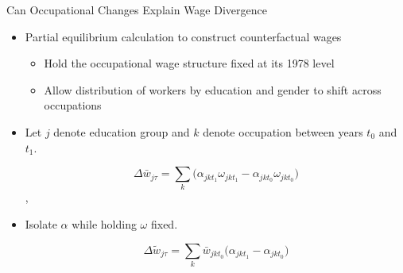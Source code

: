 \documentclass{beamer}
\begin{document}
\begin{frame}{Can Occupational Changes Explain Wage Divergence}

\begin{itemize}
	
	
	\item Partial equilibrium calculation to construct counterfactual wages
	
	\begin{itemize}
		
		\item Hold the occupational wage structure fixed at its 1978 level
		
		\item Allow distribution of workers by education and gender to shift across occupations 
		
	\end{itemize} 

	\medskip

	\item Let $j$ denote education group and $k$ denote occupation between years $t_0$ and $t_1$. 
	

	\begin{equation*}
		\Delta \bar{w}_{j\tau} = \sum_k \Big( \alpha_{jkt_1}\omega_{jkt_1} - \alpha_{jkt_0}\omega_{jkt_0} \Big)
	\end{equation*},
	
	 
	 \item Isolate $\alpha$ while holding $\omega$ fixed.
	 
	 \begin{equation}
	 	\Delta \tilde{w}_{j\tau} = \sum_k \bar{w}_{jkt_0} \Big( \alpha_{jkt_1} - \alpha_{jkt_0} \Big)
	 \end{equation}
	 
\end{itemize}

\end{frame}
\end{document}

